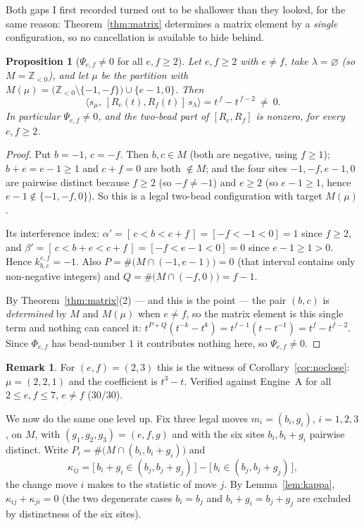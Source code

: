 \documentclass[11pt]{article}
\newtheorem{proposition}[theorem]{Proposition}
\theoremstyle{definition}
\newtheorem{remark}[theorem]{Remark}
\newcommand{\Z}{\mathbb{Z}}
\begin{document}
Both gaps I first recorded turned out to be shallower than they looked, for the same
reason: Theorem~\ref{thm:matrix} determines a matrix element by a \emph{single}
configuration, so no cancellation is available to hide behind.

\begin{proposition}[$\Psi_{e,f}\ne0$ for all $e,f\ge2$]\label{prop:psiwitness}
Let $e,f\ge2$ with $e\ne f$, take $\lambda=\varnothing$ (so $M=\Z_{<0}$), and let $\mu$ be
the partition with $M(\mu)=\bigl(\Z_{<0}\setminus\{-1,-f\}\bigr)\cup\{e-1,0\}$.  Then
\[
  \bigl\langle s_\mu,\,[R_e(t),R_f(t)]\,s_\lambda\bigr\rangle=t^{\,f}-t^{\,f-2}\ \ne\ 0 .
\]
In particular $\Psi_{e,f}\ne0$, and the two-bead part of $[R_e,R_f]$ is nonzero, for every
$e,f\ge2$.
\end{proposition}

\begin{proof}
Put $b=-1$, $c=-f$.  Then $b,c\in M$ (both are negative, using $f\ge1$);
$b+e=e-1\ge1$ and $c+f=0$ are both $\notin M$; and the four sites $-1,-f,e-1,0$ are
pairwise distinct because $f\ge2$ (so $-f\ne-1$) and $e\ge2$ (so $e-1\ge1$, hence
$e-1\notin\{-1,-f,0\}$).  So this is a legal two-bead configuration with target $M(\mu)$.

Its interference index: $\alpha'=[\,c<b<c+f\,]=[-f<-1<0]=1$ since $f\ge2$, and
$\beta'=[\,c<b+e<c+f\,]=[-f<e-1<0]=0$ since $e-1\ge1>0$.  Hence
$k^{e,f}_{b,c}=-1$.  Also $P=\#\bigl(M\cap(-1,e-1)\bigr)=0$ (that interval contains only
non-negative integers) and $Q=\#\bigl(M\cap(-f,0)\bigr)=f-1$.

By Theorem~\ref{thm:matrix}(2) --- and this is the point --- the pair $(b,c)$ is
\emph{determined} by $M$ and $M(\mu)$ when $e\ne f$, so the matrix element is this single
term and nothing can cancel it:
$t^{P+Q}(t^{-k}-t^{k})=t^{f-1}(t-t^{-1})=t^{f}-t^{f-2}$.
Since $\Phi_{e,f}$ has bead-number $1$ it contributes nothing here, so
$\Psi_{e,f}\ne0$.
\end{proof}

\begin{remark}
For $(e,f)=(2,3)$ this is the witness of Corollary~\ref{cor:noclose}:
$\mu=(2,2,1)$ and the coefficient is $t^{3}-t$.  Verified against Engine~A for all
$2\le e,f\le7$, $e\ne f$ ($30/30$).
\end{remark}

We now do the same one level up.  Fix three legal moves $m_i=(b_i,g_i)$, $i=1,2,3$, on
$M$, with $(g_1,g_2,g_3)=(e,f,g)$ and with the six sites $b_i,b_i+g_i$ pairwise distinct.
Write $P_i=\#\bigl(M\cap(b_i,b_i+g_i)\bigr)$ and
\[
  \kappa_{ij}=\bigl[\,b_i+g_i\in(b_j,b_j+g_j)\,\bigr]-\bigl[\,b_i\in(b_j,b_j+g_j)\,\bigr],
\]
the change move $i$ makes to the statistic of move $j$.  By Lemma~\ref{lem:kappa},
$\kappa_{ij}+\kappa_{ji}=0$ (the two degenerate cases $b_i=b_j$ and $b_i+g_i=b_j+g_j$ are
excluded by distinctness of the six sites).
\end{document}

